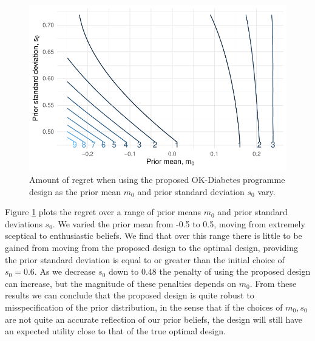 \documentclass[sagev, Crown]{sagej} %
\begin{document}
\begin{figure}
\centering
\includegraphics[scale=0.8]{./figures/sens_p.pdf}
\caption{Amount of regret when using the proposed OK-Diabetes programme design as the prior mean $m_0$ and prior standard deviation $s_0$ vary. }
\label{fig:sens_p}
\end{figure} 

Figure \ref{fig:sens_p} plots the regret over a range of prior means $m_0$ and prior standard deviations $s_0$. We varied the prior mean from -0.5 to 0.5, moving from extremely sceptical to enthusiastic beliefs. We find that over this range there is little to be gained from moving from the proposed design to the optimal design, providing the prior standard deviation is equal to or greater than the initial choice of $s_0 = 0.6$. As we decrease $s_0$ down to 0.48 the penalty of using the proposed design can increase, but the magnitude of these penalties depends on $m_0$. From these results we can conclude that the proposed design is quite robust to misspecification of the prior distribution, in the sense that if the choices of $m_0, s_0$ are not quite an accurate reflection of our prior beliefs, the design will still have an expected utility close to that of the true optimal design.
\end{document}
